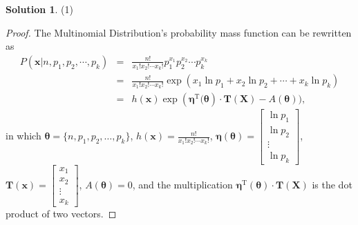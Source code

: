 \documentclass[a4paper,UTF8]{article}
\numberwithin{equation}{section}
\theoremstyle{definition}
\newtheorem*{solution}{Solution}
\begin{document}
\begin{solution}
\item[(1)]
\begin{proof}
The Multinomial Distribution's probability mass function can be rewritten as
\begin{eqnarray}
P(\bm{x}|n, p_1, p_2,\cdots, p_k)&=&\frac{n!}{x_1!x_2!\cdots x_k!}p_1^{x_1}p_2^{x_2}\cdots p_k^{x_k}\nonumber\\
&=&\frac{n!}{x_1!x_2!\cdots x_k!}\exp(x_1\ln p_1+x_2\ln p_2+\cdots+x_k\ln p_k)\nonumber\\
&=&h(\bm{x})\exp(\bm{\eta}^\mathrm{T}{(\bm{\theta}})\cdot \bm{T}(\bm{X})-A(\bm{\theta})),
\end{eqnarray}
in which $\bm{\theta}=\{n, p_1,p_2, \dots, p_k\}$, $h(\bm{x})=\frac{n!}{x_1!x_2!\cdots x_k!}$, $\bm{\eta}(\bm{\theta})=\left[\begin{array}{c}\ln p_1\\\ln p_2\\\vdots\\\ln p_k\end{array}\right]$, $\bm{T}(\bm{x})=\left[\begin{array}{c}x_1\\x_2\\\vdots\\x_k\end{array}\right]$, $A(\bm{\theta})=0$, and the multiplication 
$\bm{\eta}^\mathrm{T}(\bm{\theta})\cdot \bm{T}(\bm{X})$ is the dot product of two vectors.
\end{proof}


\end{solution}
\end{document}
